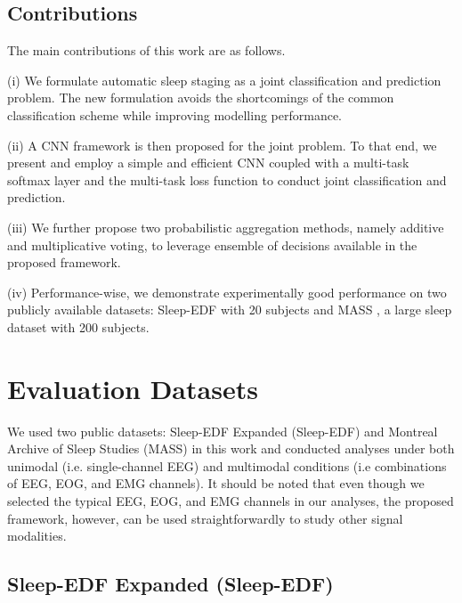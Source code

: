 \documentclass[10pt,twocolumn,twoside]{IEEEtran}
\begin{document}
\subsection{Contributions}
The main contributions of this work are as follows.

(i) We formulate automatic sleep staging as a joint classification and prediction problem. The new formulation avoids the shortcomings of the common classification scheme while improving modelling performance.

(ii) A CNN framework is then proposed for the joint problem. To that end, we present and employ a simple and efficient CNN coupled with a multi-task softmax layer and the multi-task loss function to conduct joint classification and prediction.

(iii) We further propose two probabilistic aggregation methods, namely additive and multiplicative voting, to leverage ensemble of decisions available in the proposed framework. 

(iv) Performance-wise, we demonstrate experimentally good performance on two publicly available datasets: Sleep-EDF  \cite{Kemp2000,Goldberger2000} with 20 subjects and  MASS \cite{Oreilly2014}, a large sleep dataset with 200 subjects.

\section{Evaluation Datasets}
\label{sec:datasets}

We used two public datasets: Sleep-EDF Expanded (Sleep-EDF) and Montreal Archive of Sleep Studies (MASS) in this work and conducted analyses under both unimodal (i.e. single-channel EEG) and multimodal conditions (i.e combinations of EEG, EOG, and EMG channels). It should be noted that even though we selected the typical EEG, EOG, and EMG channels in our analyses, the proposed framework, however, can be used straightforwardly to study other signal modalities.

\subsection{Sleep-EDF Expanded (Sleep-EDF)}
\end{document}
